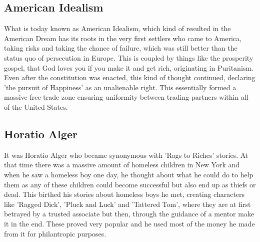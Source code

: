 \documentclass{article}
\begin{document}
	\subsection{American Idealism}
	What is today known as American Idealism, which kind of resulted in the American Dream has its roots in the very first settlers who came to America, taking risks and taking the chance of failure, which was still better than the status quo of persecution in Europe. This is coupled by things like the prosperity gospel, that God loves you if you make it and get rich, originating in Puritanism. \\
	Even after the constitution was enacted, this kind of thought continued, declaring 'the pursuit of Happiness' as an unalienable right. This essentially formed a massive free-trade zone ensuring uniformity between trading partners within all of the United States. \\
	\subsection{Horatio Alger}
	It was Horatio Alger who became synonymous with 'Rags to Riches' stories. At that time there was a massive amount of homeless children in New York and when he saw a homeless boy one day, he thought about what he could do to help them as any of these children could become successful but also end up as thiefs or dead. This birthed his stories about homeless boys he met, creating characters like 'Ragged Dick', 'Pluck and Luck' and 'Tattered Tom', where they are at first betrayed by a trusted associate but then, through the guidance of a mentor make it in the end. These proved very popular and he used most of the money he made from it for philantropic purposes.

	

	
	
	































	
\end{document}
